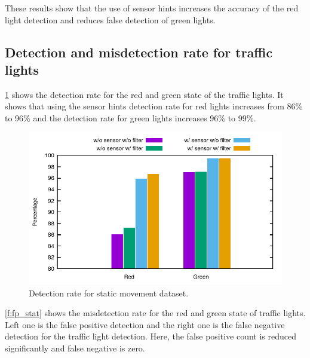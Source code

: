 These results show that the use of sensor hints increases the accuracy of the red light detection and reduces false detection of green lights.


\subsection{Detection and misdetection rate for traffic lights}
\ref{f:tp_stat} shows the detection rate for the red and green state of the traffic lights.
It shows that using the sensor hints detection rate for red lights increases from 86\% to 96\% and the detection rate for green lights increases 96\% to 99\%.

\begin{figure}[!ht]
\centering
\includegraphics[width=5.2in]{plots/bar_tp.pdf}
\caption{Detection rate for static movement dataset.}
\label{f:tp_stat}
\end{figure}

\ref{f:fp_stat} shows the misdetection rate for the red and green state of traffic lights.
Left one is the false positive detection and the right one is the false negative detection for the traffic light detection.
Here, the false positive count is reduced significantly and false negative is zero.

